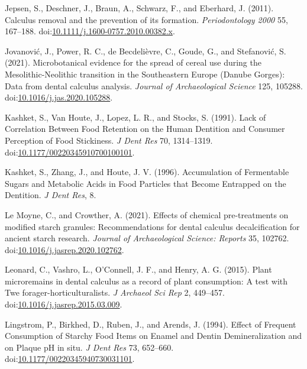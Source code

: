 \documentclass[utf8]{../templates/frontiersSCNS}
\newlength{\cslhangindent}
\newlength{\cslentryspacingunit} %
\newenvironment{CSLReferences}[2] %
 {%
  \setlength{\parindent}{0pt}
  \ifodd #1
  \let\oldpar\par
  \def\par{\hangindent=\cslhangindent\oldpar}
  \fi
  \setlength{\parskip}{#2\cslentryspacingunit}
 }%
 {}
\begin{document}
\begin{CSLReferences}{1}{0}
\leavevmode{}%
Jepsen, S., Deschner, J., Braun, A., Schwarz, F., and Eberhard, J. (2011). Calculus removal and the prevention of its formation. \emph{Periodontology 2000} 55, 167--188. doi:\href{https://doi.org/10.1111/j.1600-0757.2010.00382.x}{10.1111/j.1600-0757.2010.00382.x}.

\leavevmode{}%
Jovanović, J., Power, R. C., de Becdelièvre, C., Goude, G., and Stefanović, S. (2021). Microbotanical evidence for the spread of cereal use during the {Mesolithic-Neolithic} transition in the {Southeastern Europe} ({Danube Gorges}): {Data} from dental calculus analysis. \emph{Journal of Archaeological Science} 125, 105288. doi:\href{https://doi.org/10.1016/j.jas.2020.105288}{10.1016/j.jas.2020.105288}.

\leavevmode{}%
Kashket, S., Van Houte, J., Lopez, L. R., and Stocks, S. (1991). Lack of {Correlation Between Food Retention} on the {Human Dentition} and {Consumer Perception} of {Food Stickiness}. \emph{J Dent Res} 70, 1314--1319. doi:\href{https://doi.org/10.1177/00220345910700100101}{10.1177/00220345910700100101}.

\leavevmode{}%
Kashket, S., Zhang, J., and Houte, J. V. (1996). Accumulation of {Fermentable Sugars} and {Metabolic Acids} in {Food Particles} that {Become Entrapped} on the {Dentition}. \emph{J Dent Res}, 8.

\leavevmode{}%
Le Moyne, C., and Crowther, A. (2021). Effects of chemical pre-treatments on modified starch granules: {Recommendations} for dental calculus decalcification for ancient starch research. \emph{Journal of Archaeological Science: Reports} 35, 102762. doi:\href{https://doi.org/10.1016/j.jasrep.2020.102762}{10.1016/j.jasrep.2020.102762}.

\leavevmode{}%
Leonard, C., Vashro, L., O'Connell, J. F., and Henry, A. G. (2015). Plant microremains in dental calculus as a record of plant consumption: {A} test with {Twe} forager-horticulturalists. \emph{J Archaeol Sci Rep} 2, 449--457. doi:\href{https://doi.org/10.1016/j.jasrep.2015.03.009}{10.1016/j.jasrep.2015.03.009}.

\leavevmode{}%
Lingstrom, P., Birkhed, D., Ruben, J., and Arends, J. (1994). Effect of {Frequent Consumption} of {Starchy Food Items} on {Enamel} and {Dentin Demineralization} and on {Plaque pH} in situ. \emph{J Dent Res} 73, 652--660. doi:\href{https://doi.org/10.1177/00220345940730031101}{10.1177/00220345940730031101}.


\end{CSLReferences}
\end{document}
